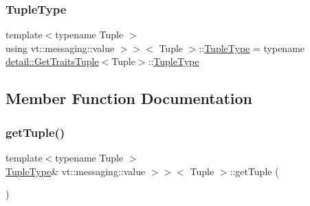 \subsubsection{\texorpdfstring{Tuple\+Type}{TupleType}}
{\footnotesize\ttfamily template$<$typename Tuple $>$ \\
using vt\+::messaging\+::value $>$$>$$<$ Tuple $>$\+::\hyperlink{structvt_1_1messaging_1_1_param_msg_3_01_tuple_00_01std_1_1enable__if__t_3_01not_01is__byte__copae27aaaf2bf1aaed1864cee3aebbc774_a63c0c672da0bf7b284da9647aad497f8}{Tuple\+Type} =  typename \hyperlink{structvt_1_1messaging_1_1detail_1_1_get_traits_tuple}{detail\+::\+Get\+Traits\+Tuple}$<$Tuple$>$\+::\hyperlink{structvt_1_1messaging_1_1_param_msg_3_01_tuple_00_01std_1_1enable__if__t_3_01not_01is__byte__copae27aaaf2bf1aaed1864cee3aebbc774_a63c0c672da0bf7b284da9647aad497f8}{Tuple\+Type}}



\subsection{Member Function Documentation}
\mbox{\label{structvt_1_1messaging_1_1_param_msg_3_01_tuple_00_01std_1_1enable__if__t_3_01not_01is__byte__copae27aaaf2bf1aaed1864cee3aebbc774_acc98e81baad8e288db26a6bdb944a4e7}} 
\subsubsection{\texorpdfstring{get\+Tuple()}{getTuple()}}
{\footnotesize\ttfamily template$<$typename Tuple $>$ \\
\hyperlink{structvt_1_1messaging_1_1_param_msg_3_01_tuple_00_01std_1_1enable__if__t_3_01not_01is__byte__copae27aaaf2bf1aaed1864cee3aebbc774_a63c0c672da0bf7b284da9647aad497f8}{Tuple\+Type}\& vt\+::messaging\+::value $>$$>$$<$ Tuple $>$\+::get\+Tuple (\begin{DoxyParamCaption}{ }\end{DoxyParamCaption})\hspace{0.3cm}{\ttfamily [inline]}}

